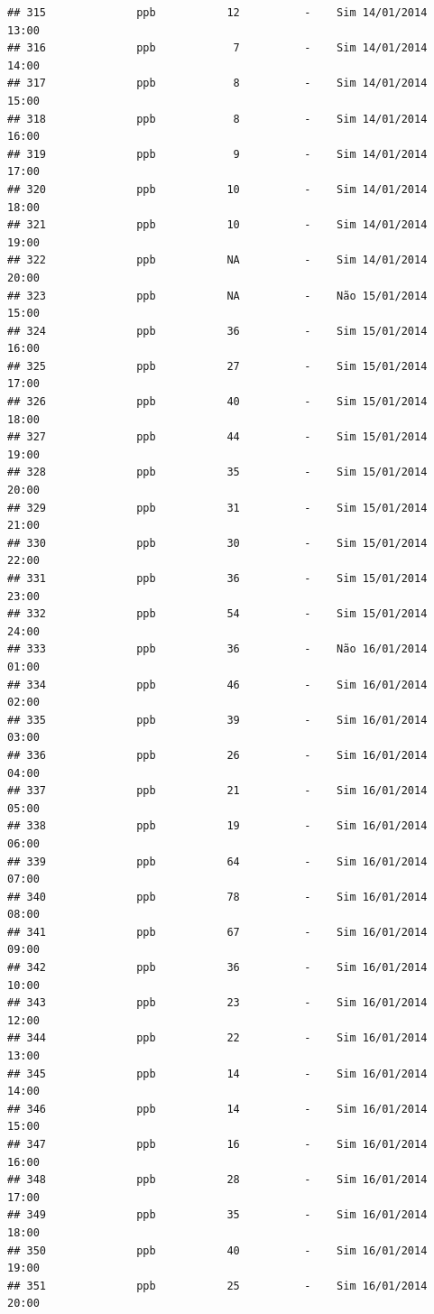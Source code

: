 \documentclass[]{book}
\begin{document}
\begin{verbatim}
## 315              ppb           12          -    Sim 14/01/2014 13:00
## 316              ppb            7          -    Sim 14/01/2014 14:00
## 317              ppb            8          -    Sim 14/01/2014 15:00
## 318              ppb            8          -    Sim 14/01/2014 16:00
## 319              ppb            9          -    Sim 14/01/2014 17:00
## 320              ppb           10          -    Sim 14/01/2014 18:00
## 321              ppb           10          -    Sim 14/01/2014 19:00
## 322              ppb           NA          -    Sim 14/01/2014 20:00
## 323              ppb           NA          -    Não 15/01/2014 15:00
## 324              ppb           36          -    Sim 15/01/2014 16:00
## 325              ppb           27          -    Sim 15/01/2014 17:00
## 326              ppb           40          -    Sim 15/01/2014 18:00
## 327              ppb           44          -    Sim 15/01/2014 19:00
## 328              ppb           35          -    Sim 15/01/2014 20:00
## 329              ppb           31          -    Sim 15/01/2014 21:00
## 330              ppb           30          -    Sim 15/01/2014 22:00
## 331              ppb           36          -    Sim 15/01/2014 23:00
## 332              ppb           54          -    Sim 15/01/2014 24:00
## 333              ppb           36          -    Não 16/01/2014 01:00
## 334              ppb           46          -    Sim 16/01/2014 02:00
## 335              ppb           39          -    Sim 16/01/2014 03:00
## 336              ppb           26          -    Sim 16/01/2014 04:00
## 337              ppb           21          -    Sim 16/01/2014 05:00
## 338              ppb           19          -    Sim 16/01/2014 06:00
## 339              ppb           64          -    Sim 16/01/2014 07:00
## 340              ppb           78          -    Sim 16/01/2014 08:00
## 341              ppb           67          -    Sim 16/01/2014 09:00
## 342              ppb           36          -    Sim 16/01/2014 10:00
## 343              ppb           23          -    Sim 16/01/2014 12:00
## 344              ppb           22          -    Sim 16/01/2014 13:00
## 345              ppb           14          -    Sim 16/01/2014 14:00
## 346              ppb           14          -    Sim 16/01/2014 15:00
## 347              ppb           16          -    Sim 16/01/2014 16:00
## 348              ppb           28          -    Sim 16/01/2014 17:00
## 349              ppb           35          -    Sim 16/01/2014 18:00
## 350              ppb           40          -    Sim 16/01/2014 19:00
## 351              ppb           25          -    Sim 16/01/2014 20:00

\end{verbatim}
\end{document}

